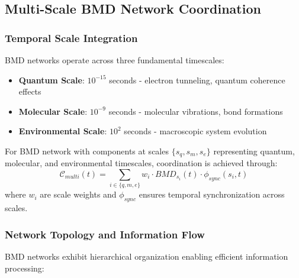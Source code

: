 \documentclass[11pt,a4paper]{article}
\begin{document}
\subsection{Multi-Scale BMD Network Coordination}

\subsubsection{Temporal Scale Integration}

BMD networks operate across three fundamental timescales:

\begin{itemize}
\item \textbf{Quantum Scale}: $10^{-15}$ seconds - electron tunneling, quantum coherence effects
\item \textbf{Molecular Scale}: $10^{-9}$ seconds - molecular vibrations, bond formations
\item \textbf{Environmental Scale}: $10^{2}$ seconds - macroscopic system evolution
\end{itemize}

\begin{definition}
For BMD network with components at scales $\{s_q, s_m, s_e\}$ representing quantum, molecular, and environmental timescales, coordination is achieved through:
\begin{equation}
\mathcal{C}_{multi}(t) = \sum_{i \in \{q,m,e\}} w_i \cdot BMD_{s_i}(t) \cdot \phi_{sync}(s_i, t)
\end{equation}
where $w_i$ are scale weights and $\phi_{sync}$ ensures temporal synchronization across scales.
\end{definition}

\subsubsection{Network Topology and Information Flow}

BMD networks exhibit hierarchical organization enabling efficient information processing:
\end{document}
